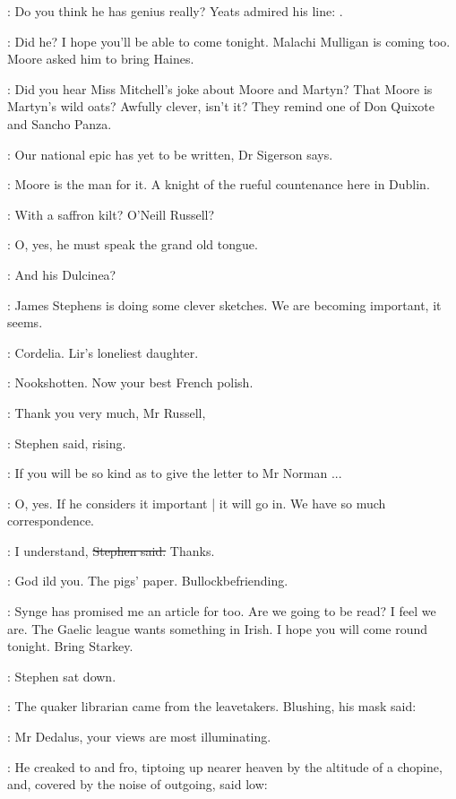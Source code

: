 \librarian:
Do you think he has genius really?
Yeats admired his line:
.

\AErussell:
Did he?
I hope you'll be able to come tonight.
Malachi Mulligan is coming too.
Moore asked him to bring Haines.

\best:
Did you hear Miss Mitchell's joke about Moore and Martyn?
That Moore is Martyn's wild oats?
Awfully clever, isn't it?
They remind one of Don Quixote and Sancho Panza.

\librarian:
Our national epic has yet to be written,
Dr Sigerson says.

\AErussell:
Moore is the man for it.
A knight of the rueful countenance here in Dublin.

\best:
With a saffron kilt?
O'Neill Russell?

\eglinton:
O, yes, he must speak the grand old tongue.

\librarian:
And his Dulcinea?

\AErussell:
James Stephens is doing some clever sketches.
We are becoming important,
it seems.

\StephenInt:
Cordelia.
Lir's loneliest daughter.

\StephenInt:
Nookshotten.
Now your best French polish.

\Stephen:
Thank you very much,
Mr Russell,

:
Stephen said, rising.

\Stephen:
If you will be so kind as to give the letter to Mr Norman ...

\AErussell:
O, yes.
If he considers it important |
it will go in.
We have so much correspondence.

\Stephen:
I understand,
\sout{Stephen said.}
Thanks.

\StephenInt:
God ild you.
The pigs' paper.
Bullockbefriending.

\AErussell:
Synge has promised me an article for  too.
Are we going to be read?
I feel we are.
The Gaelic league wants something in Irish.
I hope you will come round tonight.
Bring Starkey.

:
Stephen sat down.

:
The quaker librarian came from the leavetakers.
Blushing,
his mask said:

\librarian:
Mr Dedalus,
your views are most illuminating.

:
He creaked to and fro,
tiptoing up nearer heaven by the altitude of a chopine,
and,
covered by the noise of outgoing,
said low:

